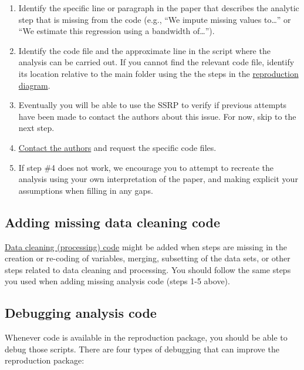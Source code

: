 \documentclass[
]{book}
\providecommand{\tightlist}{%
  \setlength{\itemsep}{0pt}\setlength{\parskip}{0pt}}
\begin{document}
\begin{enumerate}
\def\labelenumi{\arabic{enumi}.}
\tightlist
\item
  Identify the specific line or paragraph in the paper that describes the analytic step that is missing from the code (e.g., ``We impute missing values to\ldots{}'' or ``We estimate this regression using a bandwidth of\ldots{}'').\\
\item
  Identify the code file and the approximate line in the script where the analysis can be carried out. If you cannot find the relevant code file, identify its location relative to the main folder using the the steps in the \protect\hyperlink{diagram}{reproduction diagram}.\\
\item
  Eventually you will be able to use the SSRP to verify if previous attempts have been made to contact the authors about this issue. For now, skip to the next step.
\item
  \protect\hyperlink{tips-for-communication}{Contact the authors} and request the specific code files.\\
\item
  If step \#4 does not work, we encourage you to attempt to recreate the analysis using your own interpretation of the paper, and making explicit your assumptions when filling in any gaps.
\end{enumerate}

\hypertarget{cc}{%
\subsection{Adding missing data cleaning code}\label{cc}}

\protect\hyperlink{describe-inputs}{Data cleaning (processing) code} might be added when steps are missing in the creation or re-coding of variables, merging, subsetting of the data sets, or other steps related to data cleaning and processing. You should follow the same steps you used when adding missing analysis code (steps 1-5 above).

\hypertarget{dac}{%
\subsection{Debugging analysis code}\label{dac}}

Whenever code is available in the reproduction package, you should be able to debug those scripts. There are four types of debugging that can improve the reproduction package:
\end{document}

